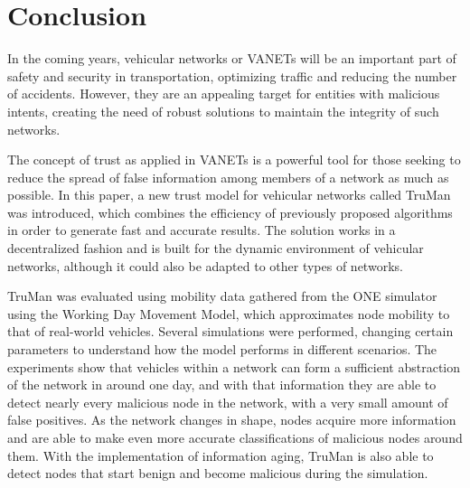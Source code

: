 \chapter{Conclusion}
\label{chap:conclusion}

In the coming years, vehicular networks or VANETs will be an important part of safety and security in transportation, optimizing traffic and reducing the number of accidents.
However, they are an appealing target for entities with malicious intents, creating the need of robust solutions to maintain the integrity of such networks.

The concept of trust as applied in VANETs is a powerful tool for those seeking to reduce the spread of false information among members of a network as much as possible.
In this paper, a new trust model for vehicular networks called TruMan was introduced, which combines the efficiency of previously proposed algorithms in order to generate fast and accurate results.
The solution works in a decentralized fashion and is built for the dynamic environment of vehicular networks, although it could also be adapted to other types of networks.


TruMan was evaluated using mobility data gathered from the ONE simulator using the Working Day Movement Model, which approximates node mobility to that of real-world vehicles.
Several simulations were performed, changing certain parameters to understand how the model performs in different scenarios.
The experiments show that vehicles within a network can form a sufficient abstraction of the network in around one day, and with that information they are able to detect nearly every malicious node in the network, with a very small amount of false positives.
As the network changes in shape, nodes acquire more information and are able to make even more accurate classifications of malicious nodes around them.
With the implementation of information aging, TruMan is also able to detect nodes that start benign and become malicious during the simulation.

